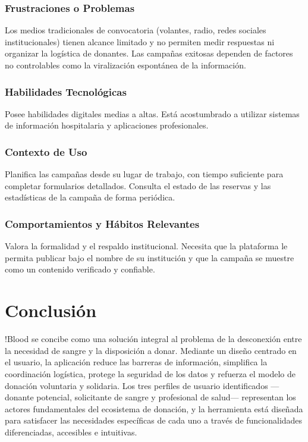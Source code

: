 \documentclass[12pt, a4paper]{article}
\begin{document}
\subsubsection{Frustraciones o Problemas}
Los medios tradicionales de convocatoria (volantes, radio, redes sociales institucionales) tienen alcance limitado y no permiten medir respuestas ni organizar la logística de donantes. Las campañas exitosas dependen de factores no controlables como la viralización espontánea de la información.

\subsubsection{Habilidades Tecnológicas}
Posee habilidades digitales medias a altas. Está acostumbrado a utilizar sistemas de información hospitalaria y aplicaciones profesionales.

\subsubsection{Contexto de Uso}
Planifica las campañas desde su lugar de trabajo, con tiempo suficiente para completar formularios detallados. Consulta el estado de las reservas y las estadísticas de la campaña de forma periódica.

\subsubsection{Comportamientos y Hábitos Relevantes}
Valora la formalidad y el respaldo institucional. Necesita que la plataforma le permita publicar bajo el nombre de su institución y que la campaña se muestre como un contenido verificado y confiable.

\newpage
\section*{Conclusión}

!Blood se concibe como una solución integral al problema de la desconexión entre la necesidad de sangre y la disposición a donar. Mediante un diseño centrado en el usuario, la aplicación reduce las barreras de información, simplifica la coordinación logística, protege la seguridad de los datos y refuerza el modelo de donación voluntaria y solidaria. Los tres perfiles de usuario identificados ---donante potencial, solicitante de sangre y profesional de salud--- representan los actores fundamentales del ecosistema de donación, y la herramienta está diseñada para satisfacer las necesidades específicas de cada uno a través de funcionalidades diferenciadas, accesibles e intuitivas.
\end{document}
